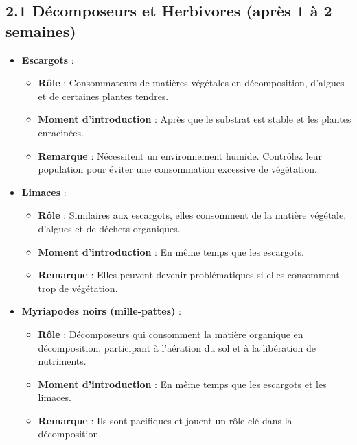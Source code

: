 \subsection*{2.1 Décomposeurs et Herbivores (après 1 à 2 semaines)}
\begin{itemize}
    \item \textbf{Escargots} :
    \begin{itemize}
        \item \textbf{Rôle} : Consommateurs de matières végétales en décomposition, d'algues et de certaines plantes tendres.
        \item \textbf{Moment d'introduction} : Après que le substrat est stable et les plantes enracinées.
        \item \textbf{Remarque} : Nécessitent un environnement humide. Contrôlez leur population pour éviter une consommation excessive de végétation.
    \end{itemize}
    \item \textbf{Limaces} :
    \begin{itemize}
        \item \textbf{Rôle} : Similaires aux escargots, elles consomment de la matière végétale, d'algues et de déchets organiques.
        \item \textbf{Moment d'introduction} : En même temps que les escargots.
        \item \textbf{Remarque} : Elles peuvent devenir problématiques si elles consomment trop de végétation.
    \end{itemize}
    \item \textbf{Myriapodes noirs (mille-pattes)} :
    \begin{itemize}
        \item \textbf{Rôle} : Décomposeurs qui consomment la matière organique en décomposition, participant à l'aération du sol et à la libération de nutriments.
        \item \textbf{Moment d'introduction} : En même temps que les escargots et les limaces.
        \item \textbf{Remarque} : Ils sont pacifiques et jouent un rôle clé dans la décomposition.
    \end{itemize}
\end{itemize}

